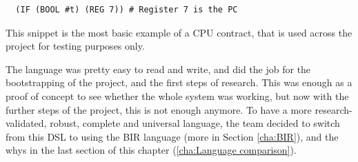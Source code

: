 \begin{verbatim}
  (IF (BOOL #t) (REG 7)) # Register 7 is the PC
\end{verbatim}

This snippet is the most basic example of a CPU contract, that is used across
the project for testing purposes only.

The language was pretty easy to read and write, and did the job for the bootstrapping
of the project, and the first steps of research. This was enough as a proof of concept
to see whether the whole system was working, but now with the further steps of
the project, this is not enough anymore. To have a more research-validated, robust,
complete and universal language, the team decided to switch from this DSL to using
the BIR language (more in Section \ref{cha:BIR}), and the whys in the last
section of this chapter (\ref{cha:Language comparison}).

